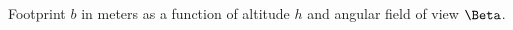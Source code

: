 \label{fig:footprint} Footprint $b$ in meters as a function of altitude $h$ and angular field of view $\Beta$.